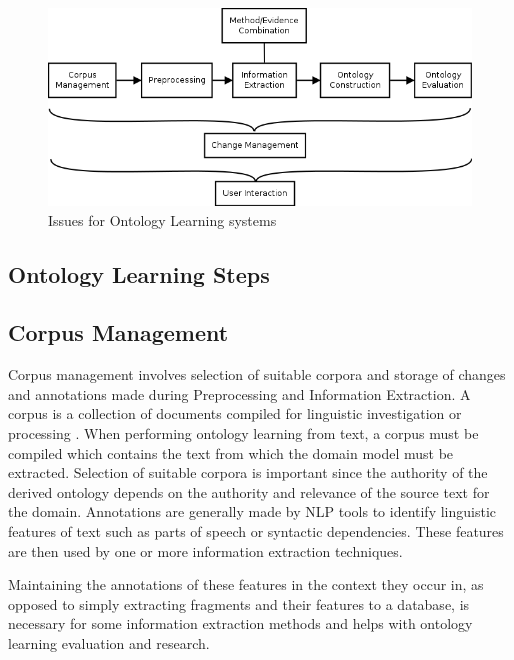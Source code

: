 \documentclass[a4paper]{report}
\begin{document}
\begin{figure}
  \includegraphics[width=\textwidth]{graphics/ontology-learning-system-issues.png}
  \caption{Issues for Ontology Learning systems}
  \label{fig:ol-issues}
\end{figure}

\subsection{Ontology Learning Steps}

\subsection{Corpus Management}

Corpus management involves selection of suitable corpora and storage of changes and annotations made during Preprocessing and Information Extraction.
A corpus is a collection of documents compiled for linguistic investigation or processing \citep{KokkinakisGerdin10MedCorp}.
When performing ontology learning from text, a corpus must be compiled which contains the text from which the domain model must be extracted.
Selection of suitable corpora is important since the authority of the derived ontology depends on the authority and relevance of the source text for the domain.
Annotations are generally made by NLP tools to identify linguistic features of text such as parts of speech or syntactic dependencies.
These features are then used by one or more information extraction techniques.

Maintaining the annotations of these features in the context they occur in, as opposed to simply extracting fragments and their features to a database, is necessary for some information extraction methods\citep{Frantzi98CNCValue, NenadicEtAl02TermSim, Srikant95GenAssocRul} and helps with ontology learning evaluation and research.
\end{document}

